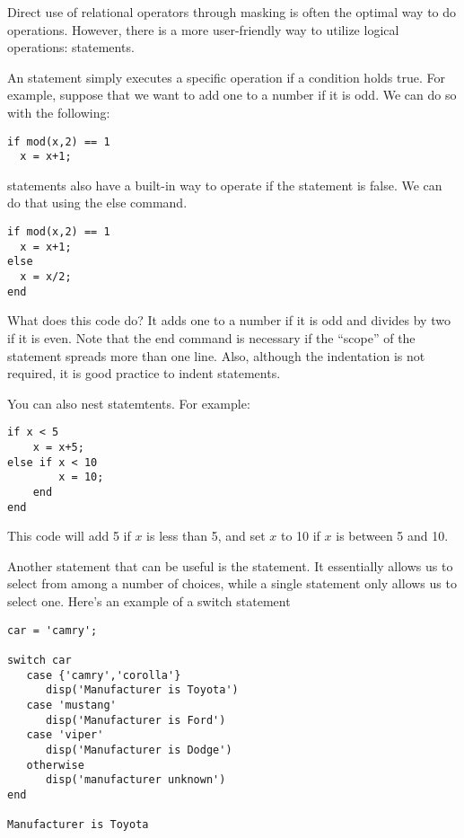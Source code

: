 

Direct use of relational operators through masking is often the optimal way to do operations. However, there is a more user-friendly way to utilize logical operations:  statements.

An  statement simply executes a specific operation if a condition holds true. For example, suppose that we want to add one to a number if it is odd. We can do so with the following:

\begin{lstlisting}[style=matlab]
if mod(x,2) == 1
  x = x+1;
\end{lstlisting}

 statements also have a built-in way to operate if the statement is false. We can do that using the else command.

\begin{lstlisting}[style=matlab]
if mod(x,2) == 1
  x = x+1;
else
  x = x/2;
end
\end{lstlisting}

What does this code do? It adds one to a number if it is odd and divides by two if it is even. Note that the end command is necessary if the ``scope'' of the  statement spreads more than one line. Also, although the indentation is not required, it is good practice to indent  statements.

You can also nest  statemtents. For example:

\begin{lstlisting}[style=matlab]
if x < 5
    x = x+5;
else if x < 10
        x = 10;
    end
end
\end{lstlisting}

This code will add 5 if $x$ is less than 5, and set $x$ to 10 if $x$ is between 5 and 10.

Another statement that can be useful is the  statement. It essentially allows us to select from among a number of choices, while a single  statement only allows us to select one. Here's an example of a switch statement

\begin{lstlisting}[style=matlab]
car = 'camry';

switch car
   case {'camry','corolla'}
      disp('Manufacturer is Toyota')
   case 'mustang'
      disp('Manufacturer is Ford')
   case 'viper'
      disp('Manufacturer is Dodge')
   otherwise
      disp('manufacturer unknown')
end

Manufacturer is Toyota
\end{lstlisting}

